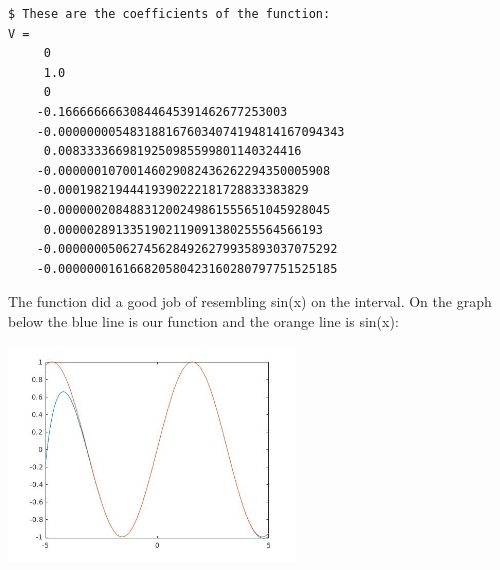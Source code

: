 \documentclass[12 pt, letterpaper]{exam}
\theoremstyle{definition}
\begin{document}
\begin{questions}
\begin{solution}
\begin{lstlisting}
$ These are the coefficients of the function:
V = 
     0
     1.0
     0
    -0.16666666630844645391462677253003
    -0.0000000054831881676034074194814167094343
     0.0083333669819250985599801140324416
    -0.00000010700146029082436262294350005908
    -0.00019821944419390222181728833383829
    -0.00000020848831200249861555651045928045
     0.0000028913351902119091380255564566193
    -0.000000050627456284926279935893037075292
    -0.000000016166820580423160280797751525185
        \end{lstlisting}
        \newpage
        The function did a good job of resembling sin(x) on the interval. On the graph below the blue line is our function and the orange line is sin(x):
        \begin{center}
            \includegraphics[width=3in]{SinVsS}
        \end{center}
    \end{solution}
\end{questions}
\end{document}
